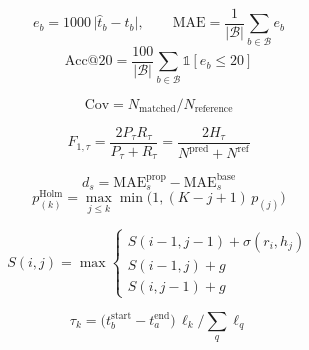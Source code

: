 
\begin{equation}
e_b = 1000\,\lvert \hat{t}_b - t_b \rvert,\qquad
\mathrm{MAE} = \frac{1}{\lvert\mathcal{B}\rvert}\sum_{b\in\mathcal{B}} e_b
\label{eq:mae}
\end{equation}
\begin{equation}
\mathrm{Acc@20} = \frac{100}{\lvert\mathcal{B}\rvert}\sum_{b\in\mathcal{B}} \mathbb{1}[e_b \le 20]
\label{eq:acc}
\end{equation}

\begin{equation}
\mathrm{Cov} = N_{\mathrm{matched}} / N_{\mathrm{reference}}
\label{eq:coverage}
\end{equation}

\begin{equation}
F_{1,\tau} = \frac{2P_\tau R_\tau}{P_\tau + R_\tau} = \frac{2H_\tau}{N^{\mathrm{pred}} + N^{\mathrm{ref}}}
\label{eq:f1}
\end{equation}

\begin{equation}
d_s = \mathrm{MAE}_s^{\mathrm{prop}} - \mathrm{MAE}_s^{\mathrm{base}}
\label{eq:speaker}
\end{equation}
\begin{equation}
p^{\mathrm{Holm}}_{(k)} = \max_{j\le k}\min\bigl(1,(K-j+1)\,p_{(j)}\bigr)
\label{eq:holm}
\end{equation}

\begin{equation}
S(i,j)=\max\begin{cases}
S(i{-}1,j{-}1)+\sigma(r_i,h_j)\\
S(i{-}1,j)+g\\
S(i,j{-}1)+g
\end{cases}
\label{eq:anchor}
\end{equation}

\begin{equation}
\tau_k = \bigl(t^{\mathrm{start}}_b - t^{\mathrm{end}}_a\bigr)\,\ell_k \Big/ \textstyle\sum_q \ell_q
\label{eq:interp}
\end{equation}

